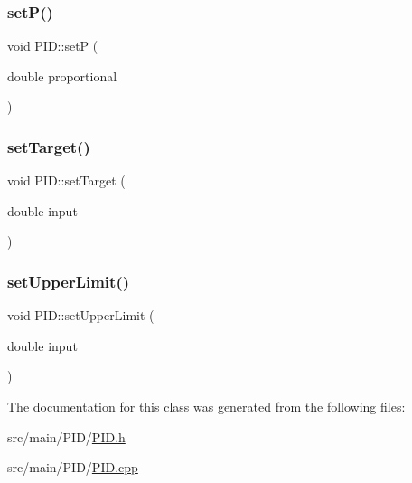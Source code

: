 \mbox{\label{classPID_a9859836fda219298f1a37124553816bb}} 
\subsubsection{\texorpdfstring{set\+P()}{setP()}}
{\footnotesize\ttfamily void P\+I\+D\+::setP (\begin{DoxyParamCaption}\item[{double}]{proportional }\end{DoxyParamCaption})}

\mbox{\label{classPID_a26c3b4eaaf92e3a2725d9b38996deab2}} 
\subsubsection{\texorpdfstring{set\+Target()}{setTarget()}}
{\footnotesize\ttfamily void P\+I\+D\+::set\+Target (\begin{DoxyParamCaption}\item[{double}]{input }\end{DoxyParamCaption})}

\mbox{\label{classPID_a2038d6acd67632ea79f5675632f5db40}} 
\subsubsection{\texorpdfstring{set\+Upper\+Limit()}{setUpperLimit()}}
{\footnotesize\ttfamily void P\+I\+D\+::set\+Upper\+Limit (\begin{DoxyParamCaption}\item[{double}]{input }\end{DoxyParamCaption})}



The documentation for this class was generated from the following files\+:\begin{DoxyCompactItemize}
\item 
src/main/\+P\+I\+D/\hyperlink{PID_8h}{P\+I\+D.\+h}\item 
src/main/\+P\+I\+D/\hyperlink{PID_8cpp}{P\+I\+D.\+cpp}\end{DoxyCompactItemize}
